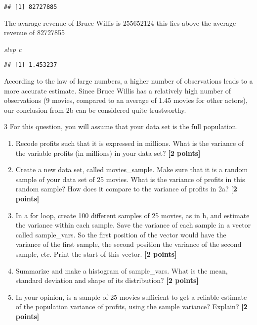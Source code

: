 \documentclass[
]{article}
\newenvironment{Shaded}{\begin{snugshade}}{\end{snugshade}}
\newcommand{\FunctionTok}[1]{\textcolor[rgb]{0.13,0.29,0.53}{\textbf{#1}}}
\newcommand{\NormalTok}[1]{#1}
\newcommand{\OtherTok}[1]{\textcolor[rgb]{0.56,0.35,0.01}{#1}}
\newcommand{\SpecialCharTok}[1]{\textcolor[rgb]{0.81,0.36,0.00}{\textbf{#1}}}
\providecommand{\tightlist}{%
  \setlength{\itemsep}{0pt}\setlength{\parskip}{0pt}}
\begin{document}
\begin{Shaded}
\end{Shaded}

\begin{verbatim}
## [1] 82727885
\end{verbatim}

The avarage revenue of Bruce Willis is 255652124 this lies above the
average revenue of 82727855

\emph{step c}

\begin{Shaded}
\end{Shaded}

\begin{verbatim}
## [1] 1.453237
\end{verbatim}

According to the law of large numbers, a higher number of observations
leads to a more accurate estimate. Since Bruce Willis has a relatively
high number of observations (9 movies, compared to an average of 1.45
movies for other actors), our conclusion from 2b can be considered quite
trustworthy.

3 For this question, you will assume that your data set is the full
population.

\begin{enumerate}
\def\labelenumi{\alph{enumi}.}
\tightlist
\item
  Recode profits such that it is expressed in millions. What is the
  variance of the variable profits (in millions) in your data set?
  \textbf{[2 points]}
\item
  Create a new data set, called movies\_sample. Make sure that it is a
  random sample of your data set of 25 movies. What is the variance of
  profits in this random sample? How does it compare to the variance of
  profits in 2a? \textbf{[2 points]}
\item
  In a for loop, create 100 different samples of 25 movies, as in b, and
  estimate the variance within each sample. Save the variance of each
  sample in a vector called sample\_vars. So the first position of the
  vector would have the variance of the first sample, the second
  position the variance of the second sample, etc. Print the start of
  this vector. \textbf{[2 points]}
\item
  Summarize and make a histogram of sample\_vars. What is the mean,
  standard deviation and shape of its distribution? \textbf{[2 points]}
\item
  In your opinion, is a sample of 25 movies sufficient to get a reliable
  estimate of the population variance of profits, using the sample
  variance? Explain? \textbf{[2 points]}
\end{enumerate}
\end{document}
